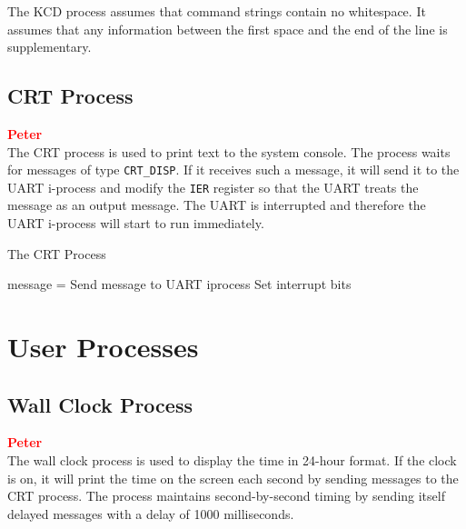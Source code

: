 \documentclass[12pt]{report}
\begin{document}
The KCD process assumes that command strings contain no whitespace. It assumes that any information between the first space and the end of the line is supplementary.\\

\subsection{CRT Process}

\textcolor{red}{\textbf{Peter}} \\

The CRT process is used to print text to the system console. The process waits for messages of type {\tt CRT\_DISP}. If it receives such a message, it will send it to the UART i-process and modify the {\tt IER} register so that the UART treats the message as an output message. The UART is interrupted and therefore the UART i-process will start to run immediately.\\

\begin{algorithm}
  \caption{The CRT Process}
  \begin{algorithmic}[1]
			\State message = 
				\State Send message to UART iprocess
				\State Set interrupt bits
			\Else
				\State {}
			\EndIf
		\EndWhile
    \EndProcedure
  \end{algorithmic}
\end{algorithm}


\section{User Processes}

\subsection{Wall Clock Process}

\textcolor{red}{\textbf{Peter}} \\

The wall clock process is used to display the time in 24-hour format. If the clock is on, it will print the time on the screen each second by sending messages to the CRT process. The process maintains second-by-second timing by sending itself delayed messages with a delay of 1000 milliseconds.\\
\end{document}
